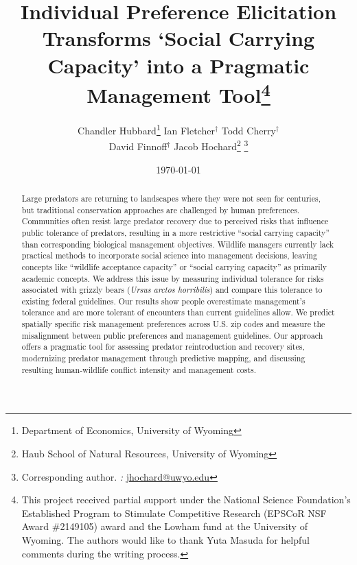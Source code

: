 \documentclass[english,12pt]{article}
\begin{document}
%

\title{\Large{{Individual Preference Elicitation Transforms `Social Carrying Capacity' into a Pragmatic Management Tool\thanks{This project received partial support under the National Science Foundation's Established Program to Stimulate Competitive Research (EPSCoR NSF Award \#2149105) award and the Lowham fund at the University of Wyoming. The authors would like to thank Yuta Masuda for helpful comments during the writing process.}}
}}

\author{Chandler Hubbard\thanks{Department of Economics, University of Wyoming}
\quad Ian Fletcher$^\dagger$ 
\quad Todd Cherry$^\dagger$\\
David Finnoff$^\dagger$ \quad Jacob Hochard\thanks{Haub School of Natural Resources, University of Wyoming} \thanks{Corresponding author. {\it \Letter:}  \href{mailto:jhochard@uwyo.edu}{jhochard@uwyo.edu}}}

\date{\today}
\maketitle

\begin{abstract}
\linenumbers
\noindent Large predators are returning to landscapes where they were not seen for centuries, but traditional conservation approaches are challenged by human preferences. Communities often resist large predator recovery due to perceived risks that influence public tolerance of predators, resulting in a more restrictive ``social carrying capacity'' than corresponding biological management objectives. Wildlife managers currently lack practical methods to incorporate social science into management decisions, leaving concepts like ``wildlife acceptance capacity'' or ``social carrying capacity'' as primarily academic concepts. We address this issue by measuring individual tolerance for risks associated with grizzly bears (\emph{Ursus arctos horribilis}) and compare this tolerance to existing federal guidelines. Our results show people overestimate management’s tolerance and are more tolerant of encounters than current guidelines allow. We predict spatially specific risk management preferences across U.S. zip codes and measure the misalignment between public preferences and management guidelines. Our approach offers a pragmatic tool for assessing predator reintroduction and recovery sites, modernizing predator management through predictive mapping, and discussing resulting human-wildlife conflict intensity and management costs.
\end{abstract}
\bigskip
\end{document}
